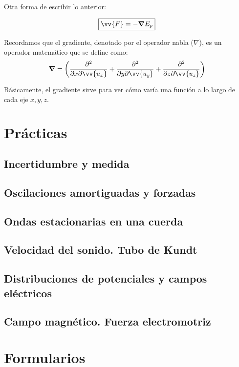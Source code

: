 \documentclass[a4paper]{book}
\numberwithin{figure}{chapter}
\numberwithin{equation}{chapter}
\renewcommand{\vec}[1]{\vv{{#1}}}
\begin{document}
Otra forma de escribir lo anterior:

\[\boxed{\vec{F} = -\grad E_p}\]

Recordamos que el gradiente, denotado por el operador nabla ($\nabla$), es un operador matemático que se define como: \[\grad = \left( \pdv{}{x}\vec{u_x} + \pdv{}{y}\vec{u_y} + \pdv{}{z}\vec{u_z}   \right)\]

Básicamente, el gradiente sirve para ver cómo varía una función a lo largo de cada eje $x, y, z$.

\chapter{Prácticas}


\section{Incertidumbre y medida}

\section{Oscilaciones amortiguadas y forzadas}

\section{Ondas estacionarias en una cuerda}

\section{Velocidad del sonido. Tubo de Kundt}

\section{Distribuciones de potenciales y campos eléctricos}

\section{Campo magnético. Fuerza electromotriz}

\setlength{\parskip}{0em}
\chapter{Formularios}
\end{document}
